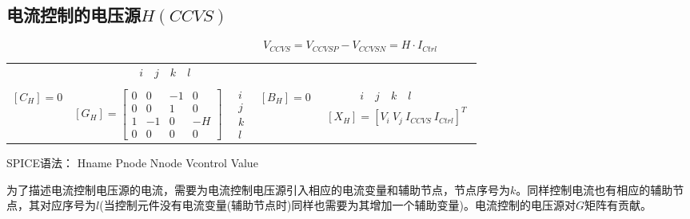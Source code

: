 \documentclass[12pt]{article}
\begin{document}
\subsection{电流控制的电压源$H(CCVS)$}
\begin{equation*}
  V_{CCVS}=V_{CCVSP} - V_{CCVSN}=H·I_{Ctrl}
\end{equation*}
\begin{table}[H]
  \centering\renewcommand{}
  \begin{tabular}{ccccc}
   & $ \qquad \quad i \quad j \quad k \quad l$ & & & \\                            \\
  $\left[C_{H}\right]=0$ & 
  $\left[G_{H}\right]=\left[\begin{array}{cccc} 0 & 0 & -1 & 0 \\ 0 & 0 & 1 & 0 \\ 1 & -1 & 0 & -H \\ 0 & 0 & 0 & 0\end{array}\right]$  & 
  $\begin{array}{c} i \\ j \\ k \\ l\end{array}$ &
  $\left[B_{H}\right]=0$ & 
  $\begin{array}{c} \qquad \quad i \quad j \quad k \quad l\\ \left[X_{H}\right]=\left[ V_{i}\ V_{j}\ I_{CCVS}\ I_{Ctrl}\right]^T \end{array}$ \\
  \end{tabular}
\end{table}
\qquad SPICE语法： Hname Pnode Nnode Vcontrol Value\par
\qquad 为了描述电流控制电压源的电流，需要为电流控制电压源引入相应的电流变量和辅助节点，节点序号为$k$。同样控制电流也有相应的辅助节点，其对应序号为$l$(当控制元件没有电流变量(辅助节点时)同样也需要为其增加一个辅助变量)。电流控制的电压源对$G$矩阵有贡献。\par
\end{document}

